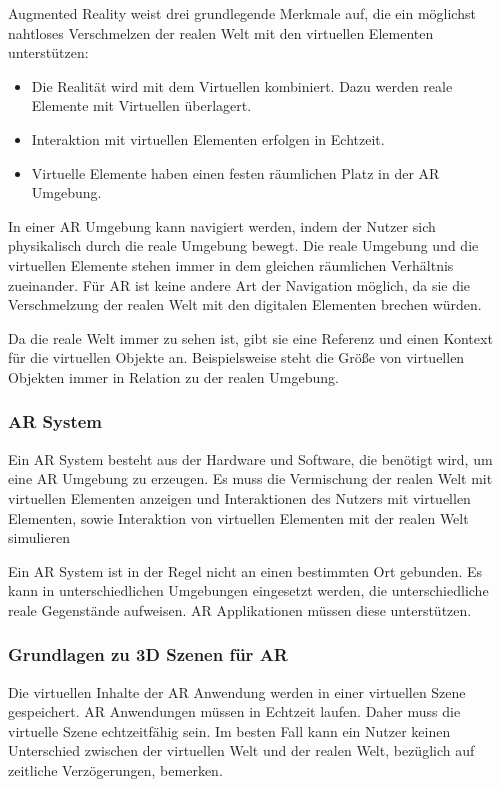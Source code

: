 Augmented Reality weist drei grundlegende Merkmale auf, die ein möglichst nahtloses Verschmelzen der realen Welt mit den virtuellen Elementen unterstützen: 
\begin{itemize}
	\item Die Realität wird mit dem Virtuellen kombiniert. Dazu werden reale Elemente mit Virtuellen überlagert.
	\item Interaktion mit virtuellen Elementen erfolgen in Echtzeit.
	\item Virtuelle Elemente haben einen festen räumlichen Platz in der AR Umgebung.
\end{itemize}

In einer AR Umgebung kann navigiert werden, indem der Nutzer sich physikalisch durch die reale Umgebung bewegt. Die reale Umgebung und die virtuellen Elemente stehen immer in dem gleichen räumlichen Verhältnis zueinander. Für AR ist keine andere Art der Navigation möglich, da sie die Verschmelzung der realen Welt mit den digitalen Elementen brechen würden.

Da die reale Welt immer zu sehen ist, gibt sie eine Referenz und einen Kontext für die virtuellen Objekte an. 
Beispielsweise steht die Größe von virtuellen Objekten immer in Relation zu der realen Umgebung.\citep{GrundlagenAR}

\subsubsection{AR System}

Ein AR System besteht aus der Hardware und Software, die benötigt wird, um eine AR Umgebung zu erzeugen. Es muss die Vermischung der realen Welt mit virtuellen Elementen anzeigen und Interaktionen des Nutzers mit virtuellen Elementen, sowie Interaktion von virtuellen Elementen mit der realen Welt simulieren

Ein AR System ist in der Regel nicht an einen bestimmten Ort gebunden. Es kann in unterschiedlichen Umgebungen eingesetzt werden, die unterschiedliche reale Gegenstände aufweisen. AR Applikationen müssen diese unterstützen.\citep{GrundlagenAR}


\subsubsection{Grundlagen zu 3D Szenen für AR}

Die virtuellen Inhalte der AR Anwendung werden in einer virtuellen Szene gespeichert. 
AR Anwendungen müssen in Echtzeit laufen. Daher muss die virtuelle Szene echtzeitfähig sein. Im besten Fall kann ein Nutzer keinen Unterschied zwischen der virtuellen Welt und der realen Welt, bezüglich auf zeitliche Verzögerungen, bemerken.

